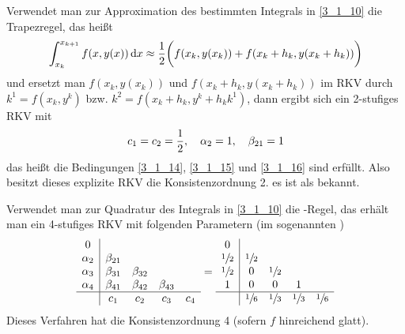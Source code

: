 Verwendet man zur Approximation des bestimmten Integrals in \cref{3_1_10} die Trapezregel, das heißt
\begin{align}
	\int_{x_k}^{x_{k+1}} f(x,y(x))\,\mathrm{d} x \approx \frac{1}{2}\bigg(f(x_k,y(x_k)) + f(x_k+h_k,y(x_k+h_k))\bigg) \notag
\end{align}
und ersetzt man $f(x_k,y(x_k))$ und $f(x_k+h_k,y(x_k+h_k))$ im RKV durch $k^1=f(x_k,y^k)$ bzw. $k^2=f(x_k+h_k,y^k+h_kk^1)$, dann ergibt sich ein 2-stufiges RKV mit
\begin{align}
	c_1=c_2=\frac{1}{2},\quad \alpha_2=1,\quad \beta_{21}=1\notag
\end{align}
das heißt die Bedingungen \cref{3_1_14}, \cref{3_1_15} und \cref{3_1_16} sind erfüllt. Also besitzt dieses explizite RKV die Konsistenzordnung 2. es ist als  bekannt. 

Verwendet man zur Quadratur des Integrals in \cref{3_1_10} die -Regel, das erhält man ein 4-stufiges RKV mit folgenden Parametern (im sogenannten )
\begin{align}
	\begin{array}{c|cccc}
	0 & & & & \\
	\alpha_2 & \beta_{21} &&& \\
	\alpha_3 & \beta_{31} & \beta_{32} && \\
	\alpha_4 & \beta_{41} & \beta_{42} & \beta_{43} & \\
	\hline
	& c_1 & c_2 & c_3 & c_4
	\end{array} =  
	\begin{array}{c|cccc}
	0 & & & & \\
	\sfrac{1}{2} & \sfrac{1}{2}  &&& \\
	\sfrac{1}{2}  & 0 & \sfrac{1}{2}  && \\
	1 & 0 & 0 & 1 & \\
	\hline
	& \sfrac{1}{6} & \sfrac{1}{3} & \sfrac{1}{3} & \sfrac{1}{6}
	\end{array}\notag
\end{align}
Dieses Verfahren hat die Konsistenzordnung 4 (sofern $f$ hinreichend glatt).